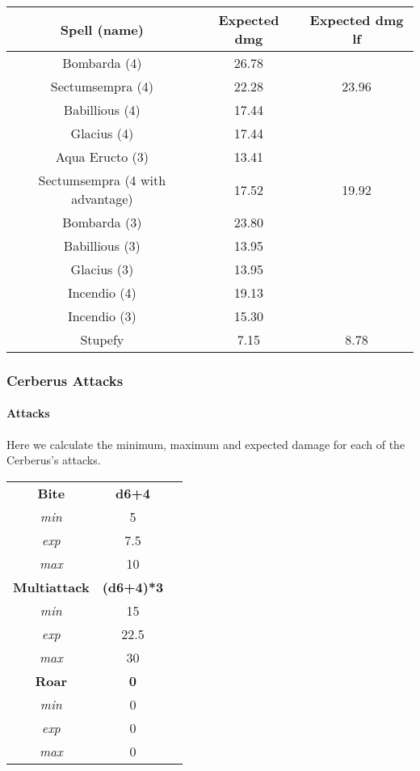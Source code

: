 \begin{tabular}{c|c|c}
	\textbf{Spell (name)} & \textbf{Expected dmg} & \textbf{Expected dmg lf} \\ \hline
	Bombarda (4)                    & 26.78 &       \\
	Sectumsempra (4)                & 22.28 & 23.96 \\
	Babillious (4)                  & 17.44 &       \\
	Glacius (4)                     & 17.44 &       \\
	Aqua Eructo (3)                 & 13.41 &       \\
	Sectumsempra (4 with advantage) & 17.52 & 19.92 \\
	Bombarda (3)                    & 23.80 &       \\
	Babillious (3)                  & 13.95 &       \\
	Glacius (3)                     & 13.95 &       \\
	Incendio (4)                    & 19.13 &       \\
	Incendio (3)                    & 15.30 &       \\
	Stupefy                         &  7.15 &  8.78 \\ \hline
\end{tabular}


\subsubsection{Cerberus Attacks}

\paragraph{Attacks} Here we calculate the minimum, maximum and expected damage for each of the Cerberus's attacks.

\begin{tabular}{c|c|c}
	\textbf{Bite}        & \textbf{d6+4}     \\
	\textit{min}         &          5        \\
	\textit{exp}         &          7.5      \\
	\textit{max}         &         10        \\ \hline
	\textbf{Multiattack} & \textbf{(d6+4)*3} \\
	\textit{min}         &         15        \\
	\textit{exp}         &         22.5      \\
	\textit{max}         &         30        \\ \hline
	\textbf{Roar}        &  \textbf{0}       \\
	\textit{min}         &          0        \\
	\textit{exp}         &          0        \\
	\textit{max}         &          0        \\ \hline
\end{tabular}

